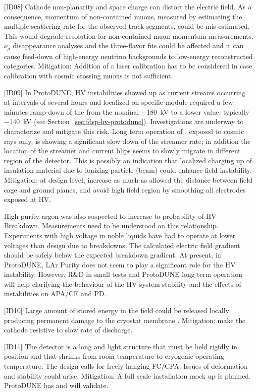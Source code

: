 [ID08] Cathode non-planarity and space charge can distort the electric field. As a consequence, momentum of non-contained muons,  measured by estimating the multiple scattering rate for the observed track segments, could be mis-estimated. This would degrade resolution for non-contained muon momentum measurements.  ${\nu}_{\mu}$ disappearance analyses and the three-flavor fits could be affected and it can cause feed-down of high-energy neutrino backgrounds to low-energy reconstructed categories.  Mitigation: Addition of a laser calibration has to be considered in case calibration with cosmic crossing muons is not sufficient. 

[ID09]  In ProtoDUNE, HV instabilities showed up as current streams occurring at intervals of several hours and localized on  specific  module required a few-minutes ramp-down of the  from the nominal \SI{-180}{kV} to a lower value, typically \SI{-140}{kV} (see Section~\ref{sec:fdsp-hv-protodune}). Investigations are underway to characterize and mitigate this risk. Long term operation of , exposed to cosmic rays only, is showing a significant slow down of the streamer rate; in addition the location of the streamer and current blips seems to slowly migrate in different region of the detector. This is possibly an indication that localized charging up of insulation material due to ionizing particle (beam) could enhance field instability. Mitigation: at design level, increase as much as allowed the distance between field cage and ground planes, and avoid high field region by smoothing all electrodes exposed at HV.

High purity argon was also suspected to increase to probability of HV Breakdown. Measurements need to be understood on this relationship. Experiments with high voltage in noble liquids have had to operate at lower voltages than design due to breakdowns. The calculated electric field gradient should be safely below the expected breakdown gradient. At present, in ProtoDUNE, LAr Purity does not seem  to play a significant role for the  HV instability. However, R\&D in small tests and ProtoDUNE long term operation will help clarifying the behaviour of the HV system stability and the effects of instabilities on APA/CE and PD. 

[ID10] Large amount of stored energy in the field could be released locally producing permanent damage to the cryostat membrane . Mitigation: make the cathode resistive to slow rate of discharge. 

[ID11]  The detector is a long and light structure that must be held rigidly in position and that shrinks from room temperature to cryogenic operating temperature. The design calls for freely hanging FC/CPA. Issues of deformation and stability could arise. Mitigation: A full scale installation mock up is planned. ProtoDUNE has and will validate. 

